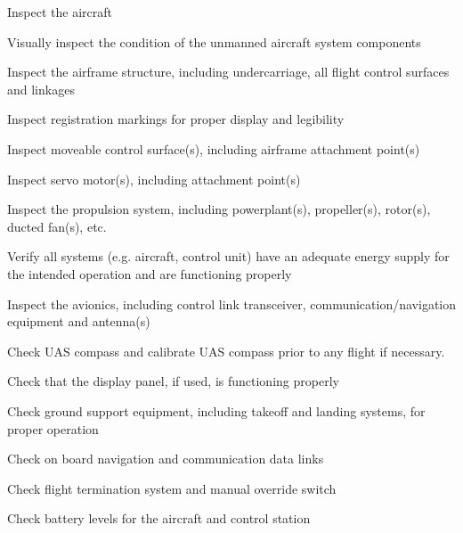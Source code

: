 \begin{checklist}
    \item Inspect the aircraft 
    \begin{checklist}
        \item Visually inspect the condition of the unmanned aircraft system components
        \item Inspect the airframe structure, including undercarriage, all flight control surfaces and linkages
        \item Inspect registration markings for proper display and legibility
        \item Inspect moveable control surface(s), including airframe attachment point(s)
        \item Inspect servo motor(s), including attachment point(s)
        \item Inspect the propulsion system, including powerplant(s), propeller(s), rotor(s), ducted fan(s), etc.
    \end{checklist}
    \item Verify all systems (e.g. aircraft, control unit) have an adequate energy supply for the intended operation and are functioning properly
    \item Inspect the avionics, including control link transceiver, communication/navigation equipment and antenna(s)
    \item Check UAS compass and calibrate UAS compass prior to any flight if necessary.
    \item Check that the display panel, if used, is functioning properly
    \item Check ground support equipment, including takeoff and landing systems, for proper operation
    \item Check on board navigation and communication data links
    \item Check flight termination system and manual override switch
    \item Check battery levels for the aircraft and control station

\end{checklist}

